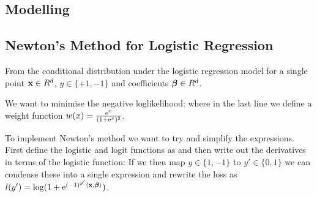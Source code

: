 \begin{appendices}

\section{Modelling}

\subsection{Newton's Method for Logistic Regression}

From the conditional distribution under the logistic regression model for a single point $\mathbf{x} \in R^d$, $y \in \{+1,-1\}$ and coefficients $\bm{\beta} \in R^d$.

We want to minimise the negative loglikelihood:
where in the last line we define a weight function $w(x) = \frac{\mathrm{e}^x}{(1+\mathrm{e}^x)^2}$.

To implement Newton's method we want to try and simplify the expressions. First define the logistic and logit functions as
and then write out the derivatives in terms of the logistic function:
If we then map $y \in \{1,-1\}$ to $y' \in \{0,1\}$ we can condense these into a single expression
and rewrite the loss as $l(y') = \log(1+\mathrm{e}^{(-1)^{y'}\langle\mathbf{x},\bm{\beta}\rangle})$.


\end{appendices}
